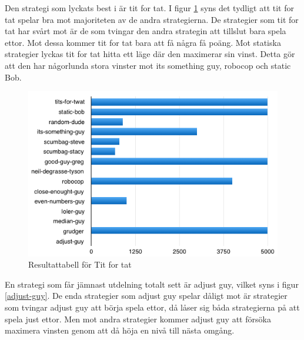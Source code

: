 \newpage

Den strategi som lyckats best i är tit for tat. I figur \ref{tit-for-tat} syns det tydligt att tit for tat spelar bra mot majoriteten av de andra strategierna. De strategier som tit for tat har svårt mot är de som tvingar den andra strategin att tillslut bara spela ettor. Mot dessa kommer tit for tat bara att få några få poäng. Mot statiska strategier lyckas tit for tat hitta ett läge där den maximerar sin vinst. Detta gör att den har någorlunda stora vinster mot its something guy, robocop och static Bob.

\begin{figure}[H]
	\begin{center}
	\includegraphics[scale=0.75, angle=0]{bilder/tit-for-tat.png}
	\caption{Resultattabell för Tit for tat}
	\label{tit-for-tat}
	\end{center}
\end{figure}

\newpage

En strategi som får jämnast utdelning totalt sett är adjust guy, vilket syns i figur \ref{adjust-guy}. De enda strategier som adjust guy spelar dåligt mot är strategier som tvingar adjust guy att börja spela ettor, då låser sig båda strategierna på att spela just ettor. Men mot andra strategier kommer adjust guy att försöka maximera vinsten genom att då höja en nivå till nästa omgång.

